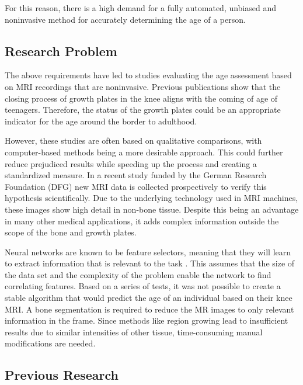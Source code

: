 For this reason, there is a high demand for a fully automated, unbiased and noninvasive method for accurately determining the age of a person.

\subsection{Research Problem}

The above requirements have led to studies evaluating the age assessment based on MRI recordings that are noninvasive. Previous publications \cite{Saring2014, Jopp2007} show that the closing process of growth plates in the knee aligns with the coming of age of teenagers. Therefore, the status of the growth plates could be an appropriate indicator for the age around the border to adulthood.

However, these studies are often based on qualitative comparisons, with computer-based methods being a more desirable approach. This could further reduce prejudiced results while speeding up the process and creating a standardized measure. In a recent study funded by the German Research Foundation (DFG) new MRI data is collected prospectively to verify this hypothesis scientifically. Due to the underlying technology used in MRI machines, these images show high detail in non-bone tissue. Despite this being an advantage in many other medical applications, it adds complex information outside the scope of the bone and growth plates.

Neural networks are known to be feature selectors, meaning that they will learn to extract information that is relevant to the task \cite{Setiono1997}. This assumes that the size of the data set and the complexity of the problem enable the network to find correlating features. Based on a series of tests, it was not possible to create a stable algorithm that would predict the age of an individual based on their knee MRI. A bone segmentation is required to reduce the MR images to only relevant information in the frame. Since methods like region growing lead to insufficient results due to similar intensities of other tissue, time-consuming manual modifications are needed.

\subsection{Previous Research}

